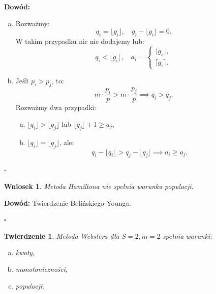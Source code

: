 \documentclass[12pt,a4paper]{article}
\theoremstyle{break}
\newtheorem{theorem}{Twierdzenie}[section]
\newtheorem{wniosek}{Wniosek}[theorem]
\begin{document}
	\noindent \textbf{Dowód:}
	\begin{enumerate}[a)]
		\item Rozważmy:
		\[
		q_i = \lfloor g_i \rfloor, \quad g_i - \lfloor g_i \rfloor = 0.
		\]
		W takim przypadku nic nie dodajemy lub:
		\[
		q_i < \lfloor g_i \rfloor, \quad a_i = 
		\begin{cases} 
			\lfloor g_i \rfloor, \\ 
			\lceil g_i \rceil.
		\end{cases}
		\]
		
		\item Jeśli $p_i > p_j$, to:
		\[
		m \cdot \frac{p_i}{p} > m \cdot \frac{p_j}{p} \implies q_i > q_j.
		\]
		Rozważmy dwa przypadki:
		\begin{enumerate}[a)]
			\item $\lfloor q_i \rfloor > \lfloor q_j \rfloor$ lub $\lfloor q_j \rfloor + 1 \geq a_j$,
			\item $\lfloor q_i \rfloor = \lfloor q_j \rfloor$, ale:
			\[
			q_i - \lfloor q_i \rfloor > q_j - \lfloor q_j \rfloor \implies a_i \geq a_j.
			\]
		\end{enumerate}
	\end{enumerate}
	\begin{flushright}
		$\square$
	\end{flushright}
	
	\begin{wniosek}
		Metoda Hamiltona nie spełnia warunku populacji.
	\end{wniosek}
	
	\noindent \textbf{Dowód:} Twierdzenie Belińskiego-Younga.
	\begin{flushright}
		$\square$
	\end{flushright}
	
	\begin{theorem}
		Metoda Webstera dla $S = 2, m = 2$ spełnia warunki:
		\begin{enumerate}[a)]
			\item kwoty,
			\item monotoniczności,
			\item populacji.
		\end{enumerate}
	\end{theorem}
	
\end{document}
